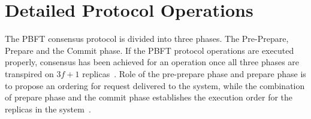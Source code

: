 

\section{Detailed Protocol Operations}
\label{sec:detailedProtocol}
The PBFT consensus protocol is divided into three phases. The Pre-Prepare, Prepare and the Commit phase. If the PBFT protocol operations are executed properly, consensus has been achieved for an operation once all three phases are transpired on $3f+1$ replicas~\cite[p.~257-259]{BOOK:BuildDepDistSyst}. Role of the pre-prepare phase and prepare phase is to propose an ordering for request delivered to the system, while the combination of prepare phase and the commit phase establishes the execution order for the replicas in the system~\cite[p.~4]{PAPER:OGPBFT}. 

